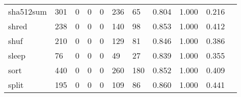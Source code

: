 \begin{longtable}{lp{1.2cm}p{1.2cm}p{1.2cm}p{1.2cm}p{1.2cm}p{1.2cm}p{1.2cm}p{1.2cm}p{1.2cm}p{1.2cm}}
sha512sum &                                   301 &                                                  0 &                                                  0 &                                                  0 &                                                236 &                                                 65 &                                         0.804 &                                              1.000 &                                              0.216 \\
shred     &                                   238 &                                                  0 &                                                  0 &                                                  0 &                                                140 &                                                 98 &                                         0.853 &                                              1.000 &                                              0.412 \\
shuf      &                                   210 &                                                  0 &                                                  0 &                                                  0 &                                                129 &                                                 81 &                                         0.846 &                                              1.000 &                                              0.386 \\
sleep     &                                    76 &                                                  0 &                                                  0 &                                                  0 &                                                 49 &                                                 27 &                                         0.839 &                                              1.000 &                                              0.355 \\
sort      &                                   440 &                                                  0 &                                                  0 &                                                  0 &                                                260 &                                                180 &                                         0.852 &                                              1.000 &                                              0.409 \\
split     &                                   195 &                                                  0 &                                                  0 &                                                  0 &                                                109 &                                                 86 &                                         0.860 &                                              1.000 &                                              0.441 \\

\end{longtable}
